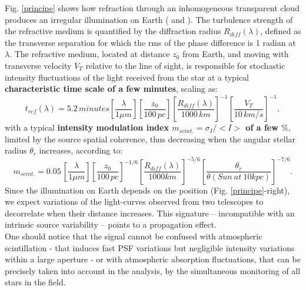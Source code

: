 \documentclass[11pt]{article}
\begin{document}
Fig. \ref{principe} shows how refraction through an inhomogeneous transparent cloud
produces an irregular illumination on Earth (\cite{Moniez} and \cite{habibietal}).
The turbulence strength of the refractive medium is quantified by the
diffraction radius $R_{diff}(\lambda)$, defined as the transverse separation
for which the rms of the phase difference is 1 radian at $\lambda$.
The refractive medium, located at distance $z_0$ from Earth,
and moving with transverse velocity $V_T$
relative to the line of sight, is responsible for stochastic
intensity fluctuations of the light received from the star
at a typical {\bf characteristic time scale of a few minutes}, scaling as:
\begin{equation}
t_{ref}(\lambda) = %
5.2\, minutes\left[\frac{\lambda}{1\mu m}\right]\left[\frac{z_0}{100\, pc}\right]\left[\frac{R_{diff}(\lambda)}{1000\, km}\right]^{-1}\left[\frac{V_T}{10\, km/s}\right]^{-1},
\label{dureescint}
\end{equation}
with a typical {\bf intensity modulation index $m_{scint.}=\sigma_I/<I>$ of a
few $\%$},
limited by the source spatial coherence, thus decreasing when
the angular stellar radius $\theta_r$ increases, according to:
\begin{equation}
m_{scint.} = 0.05 \, \left[\frac{\lambda}{1 \mu m}\right] \left[\frac{z_0}{100\, pc}\right]^{-1/6} 
                      \left[\frac{R_{diff}(\lambda)}{1000
                          km}\right]^{-5/6}
                      \left[\frac{\theta_r}{\theta(Sun\  at\  10 kpc)}\right]^{-7/6}.
\label{xparam}
\end{equation}
Since the illumination on Earth depends on the position (Fig. \ref{principe}-right),
we expect variations of the light-curves observed from two telescopes
to decorrelate when their distance increases. This signature
--  incompatible with an intrinsic source variability --
points to a propagation effect. \\
One should notice that the signal cannot be confused with atmospheric scintillation
- that induces fast PSF variations but negligible intensity variations within a large aperture \cite{dravins} - or with atmospheric absorption fluctuations, that can be precisely taken into account in the analysis, by the simultaneous monitoring of all stars in the field.
\end{document}
